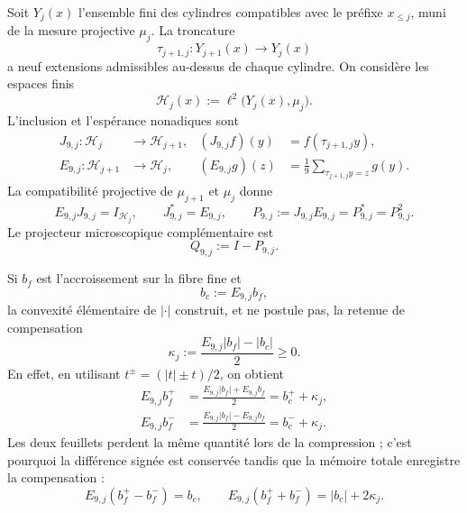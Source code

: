 Soit \(Y_j(x)\) l'ensemble fini des cylindres compatibles avec le préfixe
\(x_{\leq j}\), muni de la mesure projective \(\mu_j\). La troncature
\[
 \tau_{j+1,j}:Y_{j+1}(x)\longrightarrow Y_j(x)
\]
a neuf extensions admissibles au-dessus de chaque cylindre. On considère les
espaces finis
\[
 \mathscr H_j(x):=\ell^2\bigl(Y_j(x),\mu_j\bigr).
\]
L'inclusion et l'espérance nonadiques sont
\begin{align}
 J_{9,j}:\mathscr H_j&\longrightarrow\mathscr H_{j+1},
 &(J_{9,j}f)(y)&=f(\tau_{j+1,j}y),
 \label{eq:pdfv2-sol-j9}\\
 E_{9,j}:\mathscr H_{j+1}&\longrightarrow\mathscr H_j,
 &(E_{9,j}g)(z)&=\frac1{9}
   \sum_{\tau_{j+1,j}y=z}g(y).
 \label{eq:pdfv2-sol-e9}
\end{align}
La compatibilité projective de \(\mu_{j+1}\) et \(\mu_j\) donne
\begin{equation}\label{eq:pdfv2-sol-ej-projector}
 E_{9,j}J_{9,j}=I_{\mathscr H_j},
 \qquad
 J_{9,j}^*=E_{9,j},
 \qquad
 P_{9,j}:=J_{9,j}E_{9,j}=P_{9,j}^*=P_{9,j}^2.
\end{equation}
Le projecteur microscopique complémentaire est
\begin{equation}\label{eq:pdfv2-sol-qmicro-preliminar}
 Q_{9,j}:=I-P_{9,j}.
\end{equation}

Si \(b_f\) est l'accroissement sur la fibre fine et
\begin{equation}\label{eq:pdfv2-sol-bcoarse}
 b_c:=E_{9,j}b_f,
\end{equation}
la convexité élémentaire de \(|\cdot|\) construit, et ne postule pas, la retenue de
compensation
\begin{equation}\label{eq:pdfv2-sol-kappa}
 \kappa_j
 :=\frac{E_{9,j}|b_f|-|b_c|}{2}\geq0.
\end{equation}
En effet, en utilisant \(t^\pm=(|t|\pm t)/2\), on obtient
\begin{align}
 E_{9,j}b_f^+
 &=\frac{E_{9,j}|b_f|+E_{9,j}b_f}{2}
   =b_c^++\kappa_j,
 \label{eq:pdfv2-sol-jensen-plus}\\
 E_{9,j}b_f^-
 &=\frac{E_{9,j}|b_f|-E_{9,j}b_f}{2}
   =b_c^-+\kappa_j.
 \label{eq:pdfv2-sol-jensen-minus}
\end{align}
Les deux feuillets perdent la même quantité lors de la compression ; c'est pourquoi la différence
signée est conservée tandis que la mémoire totale enregistre la compensation :
\begin{equation}\label{eq:pdfv2-sol-jensen-dh}
 E_{9,j}(b_f^+-b_f^-)=b_c,
 \qquad
 E_{9,j}(b_f^++b_f^-)=|b_c|+2\kappa_j.
\end{equation}

